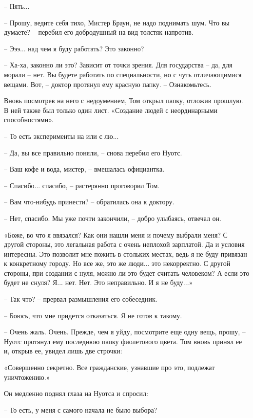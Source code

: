 – Пять... 

– Прошу, ведите себя тихо, Мистер Браун, не надо поднимать шум. Что вы думаете? – перебил его добродушный на вид толстяк напротив. 

– Эээ... над чем я буду работать? Это законно? 

– Ха-ха, законно ли это? Зависит от точки зрения. Для государства – да, для морали – нет. Вы будете работать по специальности, но с чуть отличающимися вещами. Вот, – доктор протянул ему красную папку. – Ознакомьтесь. 

Вновь посмотрев на него с недоумением, Том открыл папку, отложив прошлую. В ней также был только один лист. «Создание людей с неординарными способностями».

– То есть эксперименты на или с лю...

– Да, вы все правильно поняли, – снова перебил его Нуотс. 

– Ваш кофе и вода, мистер, – вмешалась официантка.

– Спасибо... спасибо, – растерянно проговорил Том. 

– Вам что-нибудь принести? – обратилась она к доктору.

– Нет, спасибо. Мы уже почти закончили, – добро улыбаясь, отвечал он. 

«Боже, во что я ввязался? Как они нашли меня и почему выбрали меня? С другой стороны, это легальная работа с очень неплохой зарплатой. Да и условия интересны. Это позволит мне пожить в стольких местах, ведь я не буду привязан к конкретному городу. Но все же, это же люди... это некорректно. С другой стороны, при создании с нуля, можно ли это будет считать человеком? А если это будет не снуля? Я... нет. Нет. Это неправильно. И я не буду...»

– Так что? – прервал размышления его собеседник. 

– Боюсь, что мне придется отказаться. Я не готов к такому. 

– Очень жаль. Очень. Прежде, чем я уйду, посмотрите еще одну вещь, прошу, – Нуотс протянул ему последнюю папку фиолетового цвета. Том вновь принял ее и, открыв ее, увидел лишь две строчки: 

\begin{center}«Совершенно секретно.
Все гражданские, узнавшие про это, подлежат уничтожению.»\end{center}


Он медленно поднял глаза на Нуотса и спросил: 

– То есть, у меня с самого начала не было выбора?  

